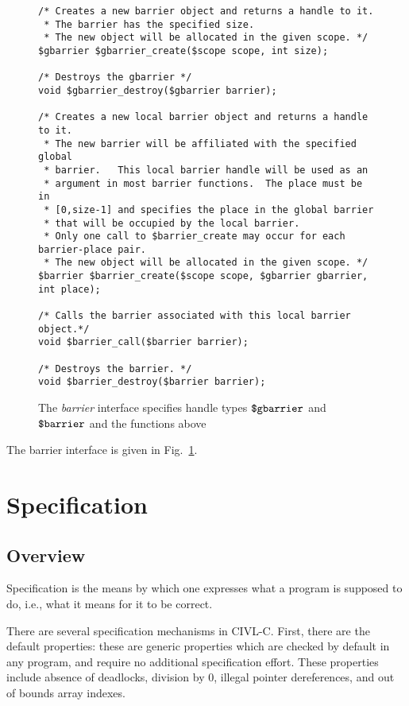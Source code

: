 \begin{figure}
  \begin{small}
\begin{verbatim}
/* Creates a new barrier object and returns a handle to it.
 * The barrier has the specified size.
 * The new object will be allocated in the given scope. */
$gbarrier $gbarrier_create($scope scope, int size);

/* Destroys the gbarrier */
void $gbarrier_destroy($gbarrier barrier);

/* Creates a new local barrier object and returns a handle to it.
 * The new barrier will be affiliated with the specified global
 * barrier.   This local barrier handle will be used as an
 * argument in most barrier functions.  The place must be in
 * [0,size-1] and specifies the place in the global barrier
 * that will be occupied by the local barrier.  
 * Only one call to $barrier_create may occur for each barrier-place pair.
 * The new object will be allocated in the given scope. */
$barrier $barrier_create($scope scope, $gbarrier gbarrier, int place);

/* Calls the barrier associated with this local barrier object.*/
void $barrier_call($barrier barrier);

/* Destroys the barrier. */
void $barrier_destroy($barrier barrier);
\end{verbatim}
  \end{small}
  \caption{The \emph{barrier} interface specifies handle 
    types $\mbox{\texttt{\${}gbarrier}}$ and $\mbox{\texttt{\${}barrier}}$ and the functions above}
  \label{fig:barrier}
\end{figure}

The barrier interface is given in Fig.\ \ref{fig:barrier}.

\chapter{Specification}

\section{Overview}

Specification is the means by which one expresses what a program is
supposed to do, i.e., what it means for it to be correct.

There are several specification mechanisms in CIVL-C. First, there are
the default properties: these are generic properties which are checked
by default in any program, and require no additional specification
effort. These properties include absence of deadlocks, division by 0,
illegal pointer dereferences, and out of bounds array indexes.

